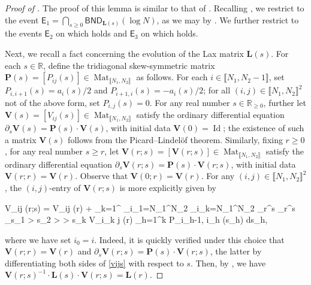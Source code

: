 \documentclass{amsart}
\numberwithin{equation}{section}
\DeclareMathOperator{\Id}{Id}
\DeclareMathOperator{\Mat}{Mat}
\theoremstyle{remark}
\theoremstyle{definition}
\begin{document}
	\begin{proof}[Proof of ]
		
		The proof of this lemma is similar to that of \cite[Lemma 5.2]{LC}. Recalling , we restrict to the event $\mathsf{E}_1 =  \bigcap_{s \ge 0} \mathsf{BND}_{\bm{L}(s)} (\log N)$, as we may by . We further restrict to the events $\mathsf{E}_2$ on which  holds and $\mathsf{E}_3$ on which  holds.  
		
		Next, we recall a fact concerning the evolution of the Lax matrix $\bm{L}(s)$. For each $s \in \mathbb{R}$, define the tridiagonal skew-symmetric matrix $\bm{P} (s) = [ P_{ij} (s) ] \in \Mat_{\llbracket N_1, N_2 \rrbracket}$ as follows. For each $i \in \llbracket N_1, N_2 - 1 \rrbracket$, set $P_{i,i+1} (s) = a_i (s)/2$ and $P_{i+1,i} (s) = -a_i (s)/2$; for all $(i, j) \in \llbracket N_1, N_2 \rrbracket^2$ not of the above form, set $P_{i,j} (s) = 0$. For any real number $s \in \mathbb{R}_{\ge 0}$, further let $\bm{V}(s) = [ V_{ij} (s) ] \in \Mat_{\llbracket N_1, N_2 \rrbracket}$ satisfy the ordinary differential equation $\partial_s \bm{V}(s) = \bm{P}(s) \cdot \bm{V}(s)$, with initial data $\bm{V}(0) = \Id$; the existence of such a matrix $\bm{V}(s)$ follows from the Picard--Lindel\"{o}f theorem. Similarly, fixing $r \ge 0$, for any real number $s \ge r$, let $\bm{V}(r;s) = [\bm{V} (r;s)] \in \Mat_{\llbracket N_1, N_2 \rrbracket}$ satisfy the ordinary differential equation $\partial_s \bm{V} (r; s) = \bm{P} (s) \cdot \bm{V} (r; s)$, with initial data $\bm{V}(r;r) = \bm{V}(r)$. Observe that $\bm{V} (0;r) = \bm{V}(r)$. For any $(i, j) \in \llbracket N_1, N_2 \rrbracket^2$, the $(i,j)$-entry of $\bm{V}(r;s)$ is more explicitly given by 
		\begin{flalign}
			\label{vijs}
			V_{ij} (r;s) = V_{ij} (r) + \displaystyle\sum_{k=1}^{\infty}  \displaystyle\sum_{i_1=N_1}^{N_2} \cdots \displaystyle\sum_{i_k=N_1}^{N_2}  \displaystyle\int_r^s \cdots \displaystyle\int_r^s _{s_1 > s_2 > \cdots > s_k} \cdot V_{i_k j} (r) \displaystyle\prod_{h=1}^k P_{i_{h-1}, i_h} (s_h) ds_h,
		\end{flalign} 
		
		\noindent where we have set $i_0 = i$. Indeed, it is quickly verified under this choice that $\bm{V}(r;r) = \bm{V}(r)$ and $\partial_s \bm{V}(r;s) = \bm{P}(s) \cdot \bm{V}(r;s)$, the latter by differentiating both sides of \eqref{vijs} with respect to $s$. Then, by \cite[Section 2]{FMPL}, we have $\bm{V} (r; s)^{-1} \cdot \bm{L}(s) \cdot \bm{V}(r; s) = \bm{L}(r)$. 
		

\end{proof}
\end{document}
